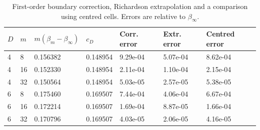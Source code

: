 \begin{table}[htbp]
\centering
\caption{First-order boundary correction, Richardson extrapolation and a comparison using centred cells. Errors are relative to $\beta_\infty$.}
\label{tab:fragment_correction}
\begin{tabular}{lllllll}
\toprule
$D$ & $m$ & $m(\beta_m-\beta_\infty)$ & $c_D$ & Corr. error & Extr. error & Centred error \\
\midrule
4 & 8 & 0.156382 & 0.148954 & 9.29e-04 & 5.07e-04 & 8.62e-04 \\
4 & 16 & 0.152330 & 0.148954 & 2.11e-04 & 1.10e-04 & 2.15e-04 \\
4 & 32 & 0.150564 & 0.148954 & 5.03e-05 & 2.57e-05 & 5.38e-05 \\
6 & 8 & 0.175460 & 0.169507 & 7.44e-04 & 4.06e-04 & 6.67e-04 \\
6 & 16 & 0.172214 & 0.169507 & 1.69e-04 & 8.87e-05 & 1.66e-04 \\
6 & 32 & 0.170796 & 0.169507 & 4.03e-05 & 2.06e-05 & 4.16e-05 \\
\bottomrule
\end{tabular}
\end{table}
